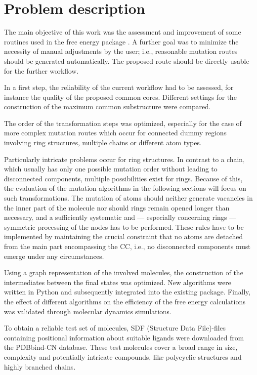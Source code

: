 \chapter{Problem description }

The main objective of this work was the assessment and improvement of some routines
used in the free energy package {\trafo}. A further goal was to
minimize the necessity of manual adjustments by the user; i.e.,
reasonable mutation routes should be generated automatically. The
proposed route should be directly usable for the further {\trafo}
workflow.

In a first step, the reliability of the current {\trafo} workflow
had to be assessed, for instance the quality of the proposed common
cores. Different settings for the construction of the maximum common
substructure were compared. 

The order of the transformation steps was optimized, especially
for the case of more complex mutation routes which occur for connected
dummy regions involving ring structures, multiple chains or different
atom types. 

Particularly intricate problems occur for ring structures. In contrast to a chain, which usually has only one possible mutation order without leading to disconnected components, multiple possibilities  exist for rings. Because of this, the evaluation of the mutation algorithms in the following sections will focus on such transformations. The mutation of atoms should neither generate vacancies in the inner part of the
molecule nor should rings remain opened longer than necessary, and
a sufficiently systematic and --- especially concerning rings --- symmetric
processing of the nodes has to be performed. These rules have to be
implemented by maintaining the crucial constraint that no atoms are
detached from the main part encompassing the CC, i.e., no
disconnected components must emerge under any circumstances.

Using a graph representation of the involved molecules, the construction
of the intermediates between the final states was optimized.
New algorithms were written in Python and subsequently integrated
into the existing {\trafo} package. Finally, the effect of different
algorithms on the efficiency of the free energy calculations was validated through molecular dynamics simulations. 

To obtain a reliable test set of molecules, SDF (Structure Data File)-files containing positional information about suitable ligands were downloaded from the PDBbind-CN \cite{Wang.2004} database. These test molecules cover a
broad range in size, complexity and potentially intricate compounds,
like polycyclic structures and highly branched chains.

